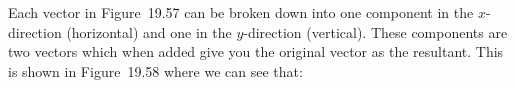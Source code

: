     \addtocounter{footnote}{-0}
    
        \label{m38819*id193858}Each vector in Figure~19.57 can be broken down into one component in the \begin{math}x\end{math}-direction (horizontal) and one in the \begin{math}y\end{math}-direction (vertical). These components are two vectors which when added give you the original vector as the resultant. This is shown in Figure~19.58 where we can see that:\par 
        \label{m38819*id193892}
          \label{m38819*id193896}\nopagebreak\noindent{}
    
